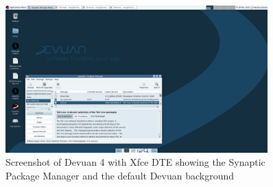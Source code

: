 %

\begin{figure}[!h]
  \centering
   \includegraphics[width=0.9\textwidth]{devuanxfce.png}
  \caption{Screenshot of Devuan 4 with Xfce DTE  showing the Synaptic Package Manager and the default Devuan background}
  \label{fig:devuanxfce}
\end{figure}

%

